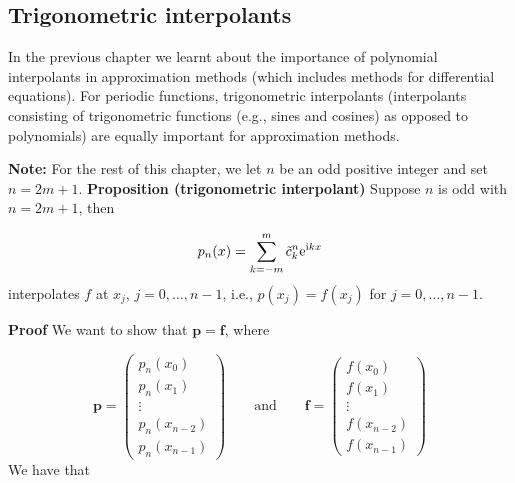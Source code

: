 \documentclass[12pt,landscape]{article}
\begin{document}
{\subsection{Trigonometric interpolants}
In the previous chapter we learnt about the importance of polynomial interpolants in approximation methods (which includes methods for differential equations).  For periodic functions, trigonometric interpolants (interpolants consisting of trigonometric functions (e.g., sines and cosines) as opposed to polynomials) are equally important for approximation methods.

\textbf{Note:} For the rest of this chapter, we let $n$ be an odd positive integer and set $n = 2m + 1$.
\newpage
\textbf{Proposition (trigonometric interpolant)} Suppose $n$ is odd with $n = 2m+1$, then 

\[
p_n(x) = \sum_{k=-m}^{m}\tilde{c}^n_{k}{\rm e}^{{\rm i}kx}
\]
interpolates $f$ at $x_j$, $j = 0, \ldots, n-1$, i.e., $p(x_j) = f(x_j)$ for $j = 0, \ldots, n-1$.

\textbf{Proof}  We want to show that $\mathbf{p} = \mathbf{f}$, where 

\[
\mathbf{p} = \left(
\begin{array}{c}
p_n(x_0) \\
p_n(x_1) \\
\vdots \\
p_n(x_{n-2}) \\
p_n(x_{n-1})
\end{array}
\right) \qquad \text{and} \qquad 
\mathbf{f} = \left(
\begin{array}{c}
f(x_0) \\
f(x_1) \\
\vdots \\
f(x_{n-2}) \\
f(x_{n-1})
\end{array}
\right)
\]
We have that

}
\end{document}
